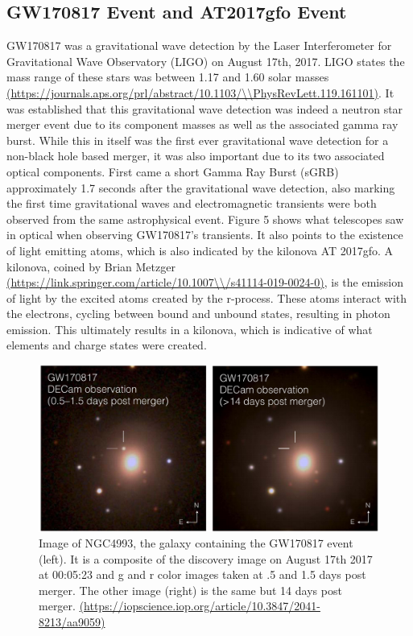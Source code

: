 \documentclass[11pt,a4paper]{article}
\begin{document}
\subsection{GW170817 Event and AT2017gfo Event}

GW170817 was a gravitational wave  detection by the Laser Interferometer for Gravitational Wave Observatory (LIGO) on August 17th, 2017. LIGO states the mass range of these stars was between 1.17 and 1.60 solar masses \url{(https://journals.aps.org/prl/abstract/10.1103/\\PhysRevLett.119.161101)}. It was established that this gravitational wave detection was indeed a neutron star merger event due to its component masses as well as the associated gamma ray burst. While this in itself was the first ever gravitational wave detection for a non-black hole based merger, it was also important due to its two associated optical components. 
First came a short Gamma Ray Burst (sGRB) approximately 1.7 seconds after the gravitational wave detection, also marking the first time gravitational waves and electromagnetic transients were both observed from the same astrophysical event. Figure 5 shows what telescopes saw in optical when observing GW170817's transients. It also points to the existence of light emitting atoms, which is also indicated by the kilonova AT 2017gfo. A kilonova, coined by Brian Metzger \url{(https://link.springer.com/article/10.1007\\/s41114-019-0024-0)}, is the emission of light by the excited atoms created by the r-process. These atoms interact with the electrons, cycling between bound and unbound states, resulting in photon emission. This ultimately results in a kilonova, which is indicative of what elements and charge states were created. 

\begin{figure}[h!]
  \includegraphics[scale = .5, width=1\textwidth]{GW170817_pic.png}
  \caption{Image of NGC4993, the galaxy containing the GW170817 event (left). It is a composite of the discovery image on August 17th 2017 at 00:05:23 and g and r color images taken at .5 and 1.5 days post merger. The other image (right) is the same but 14 days post merger. \url{(https://iopscience.iop.org/article/10.3847/2041-8213/aa9059)}}
\end{figure}
\end{document}

